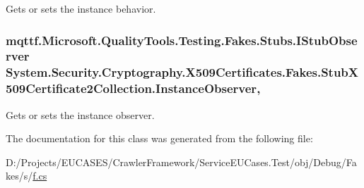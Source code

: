 Gets or sets the instance behavior.

\hypertarget{class_system_1_1_security_1_1_cryptography_1_1_x509_certificates_1_1_fakes_1_1_stub_x509_certificate2_collection_a963d4f1a7d1c641546b5ad6cb11c3e79}{
\subsubsection[{Instance\-Observer}]{\setlength{\rightskip}{0pt plus 5cm}mqttf.\-Microsoft.\-Quality\-Tools.\-Testing.\-Fakes.\-Stubs.\-I\-Stub\-Observer System.\-Security.\-Cryptography.\-X509\-Certificates.\-Fakes.\-Stub\-X509\-Certificate2\-Collection.\-Instance\-Observer\hspace{0.3cm}{\ttfamily [get]}, {\ttfamily [set]}}}\label{class_system_1_1_security_1_1_cryptography_1_1_x509_certificates_1_1_fakes_1_1_stub_x509_certificate2_collection_a963d4f1a7d1c641546b5ad6cb11c3e79}


Gets or sets the instance observer.



The documentation for this class was generated from the following file\-:\begin{DoxyCompactItemize}
\item 
D\-:/\-Projects/\-E\-U\-C\-A\-S\-E\-S/\-Crawler\-Framework/\-Service\-E\-U\-Cases.\-Test/obj/\-Debug/\-Fakes/s/\hyperlink{s_2f_8cs}{f.\-cs}\end{DoxyCompactItemize}
